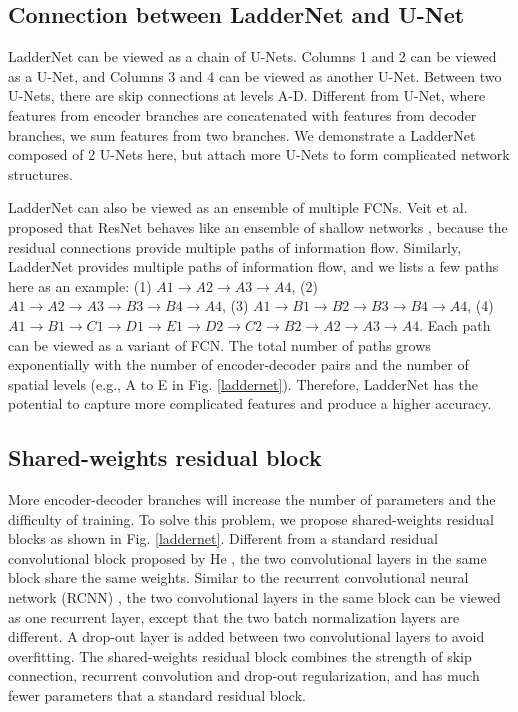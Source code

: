 \documentclass{article}
\begin{document}
\subsection{Connection between LadderNet and U-Net}
LadderNet can be viewed as a chain of U-Nets. Columns 1 and 2 can be viewed as a U-Net, and Columns 3 and 4 can be viewed as another U-Net. Between two U-Nets, there are skip connections at levels A-D. Different from U-Net, where features from encoder branches are concatenated with features from decoder branches, we sum features from two branches. We demonstrate a LadderNet composed of 2 U-Nets here, but attach more U-Nets to form complicated network structures.
\par
LadderNet can also be viewed as an ensemble of multiple FCNs. Veit et al. proposed that ResNet behaves like an ensemble of shallow networks \cite{veit2016residual}, because the residual connections provide multiple paths of information flow. Similarly, LadderNet provides multiple paths of information flow, and we lists a few paths here as an example: (1) $A1 \rightarrow A2 \rightarrow A3 \rightarrow A4$, (2) $A1 \rightarrow A2 \rightarrow A3 \rightarrow B3 \rightarrow B4 \rightarrow A4$, (3) $A1 \rightarrow B1 \rightarrow B2 \rightarrow B3 \rightarrow B4 \rightarrow A4$, (4) $A1 \rightarrow B1 \rightarrow C1 \rightarrow D1 \rightarrow E1 \rightarrow D2 \rightarrow C2 \rightarrow B2 \rightarrow A2 \rightarrow A3 \rightarrow A 4$. Each path can be viewed as a variant of FCN. The total number of paths grows exponentially with the number of encoder-decoder pairs and the number of spatial levels (e.g., A to E in Fig. \ref{laddernet}). Therefore, LadderNet has the potential to capture more complicated features and produce a higher accuracy.
\vspace{-0.1cm}
\subsection{Shared-weights residual block}
More encoder-decoder branches will increase the number of parameters and the difficulty of training. To solve this problem, we propose shared-weights residual blocks as shown in Fig. \ref{laddernet}.  Different from a standard residual convolutional block proposed by He \cite{he2016deep}, the two convolutional layers in the same block share the same weights. Similar to the recurrent convolutional neural network (RCNN) \cite{alom2017inception}, the two convolutional layers in the same block can be viewed as one recurrent layer, except that the two batch normalization layers are different. A drop-out layer is added between two convolutional layers to avoid overfitting. The shared-weights residual block combines the strength of skip connection, recurrent convolution and drop-out regularization, and has much fewer parameters that a standard residual block. 
\end{document}
